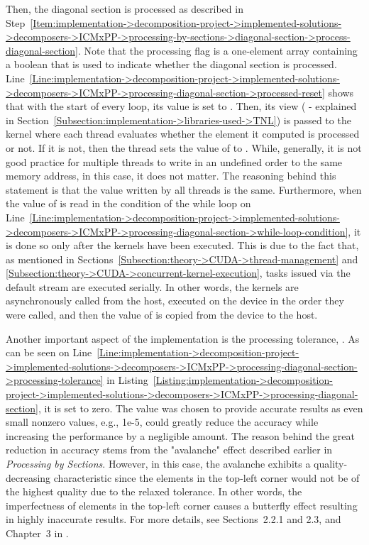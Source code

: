 Then, the diagonal section is processed as described in Step~\ref{Item:implementation->decomposition-project->implemented-solutions->decomposers->ICMxPP->processing-by-sections->diagonal-section->process-diagonal-section}. Note that the processing flag  is a one-element array containing a boolean that is used to indicate whether the diagonal section is processed. Line~\ref{Line:implementation->decomposition-project->implemented-solutions->decomposers->ICMxPP->processing-diagonal-section->processed-reset} shows that with the start of every loop, its value is set to . Then, its view ( - explained in Section~\ref{Subsection:implementation->libraries-used->TNL}) is passed to the kernel where each thread evaluates whether the element it computed is processed or not. If it is not, then the thread sets the value of  to . While, generally, it is not good practice for multiple threads to write in an undefined order to the same memory address, in this case, it does not matter. The reasoning behind this statement is that the value written by all threads is the same. Furthermore, when the value of  is read in the condition of the while loop on Line~\ref{Line:implementation->decomposition-project->implemented-solutions->decomposers->ICMxPP->processing-diagonal-section->while-loop-condition}, it is done so only after the kernels have been executed. This is due to the fact that, as mentioned in Sections~\ref{Subsection:theory->CUDA->thread-management} and \ref{Subsection:theory->CUDA->concurrent-kernel-execution}, tasks issued via the default stream are executed serially. In other words, the kernels are asynchronously called from the host, executed on the device in the order they were called, and then the value of  is copied from the device to the host.

Another important aspect of the implementation is the processing tolerance, . As can be seen on Line~\ref{Line:implementation->decomposition-project->implemented-solutions->decomposers->ICMxPP->processing-diagonal-section->processing-tolerance} in Listing~\ref{Listing:implementation->decomposition-project->implemented-solutions->decomposers->ICMxPP->processing-diagonal-section}, it is set to zero. The value was chosen to provide accurate results as even small nonzero values, e.g., 1e-5, could greatly reduce the accuracy while increasing the performance by a negligible amount. The reason behind the great reduction in accuracy stems from the "avalanche" effect described earlier in \textit{Processing by Sections}. However, in this case, the avalanche exhibits a quality-decreasing characteristic since the elements in the top-left corner would not be of the highest quality due to the relaxed tolerance. In other words, the imperfectness of elements in the top-left corner causes a butterfly effect resulting in highly inaccurate results. For more details, see Sections~2.2.1 and 2.3, and Chapter~3 in  \cite{Cejka2022}.

